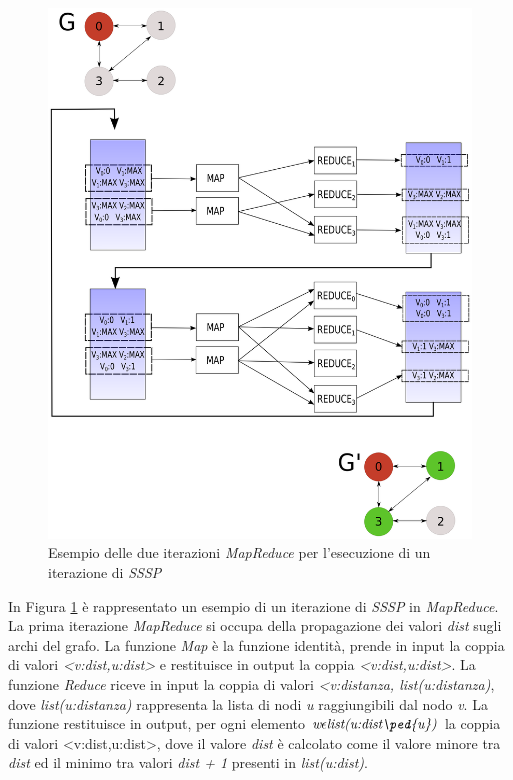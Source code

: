 \documentclass[LaM,binding=0.6cm]{sapthesis}
\begin{document}
\begin{figure}
\centering
\includegraphics[width=1\textwidth]{MR-SSSP}
\caption{Esempio delle due iterazioni \textit{MapReduce} per l'esecuzione di un iterazione di \textit{SSSP}}
\label{fig:MRSSSP}
\end{figure}

In Figura \ref{fig:MRSSSP} è rappresentato un esempio di un iterazione di \textit{SSSP} in \textit{MapReduce}.
La prima iterazione \textit{MapReduce} si occupa della propagazione dei valori \textit{dist} sugli archi del grafo.
La funzione \textit{Map} è la funzione identità, prende in input la coppia di valori \textit{<v:dist,u:dist>} e restituisce in output la coppia \textit{<v:dist,u:dist>}.
La funzione \textit{Reduce} riceve in input la coppia di valori \textit{<v:distanza, list(u:distanza)}, dove \textit{list(u:distanza)} rappresenta la lista di nodi \textit{u} raggiungibili dal nodo \textit{v}. La funzione restituisce in output, per ogni elemento $\textit{w} \epsilon \textit{list(u:dist\ped{u})}$ la coppia di valori <v:dist,u:dist>, dove il valore \textit{dist} è calcolato come il valore minore tra  \textit{dist} ed il minimo tra valori \textit{dist + 1} presenti in \textit{list(u:dist)}. 
\end{document}
